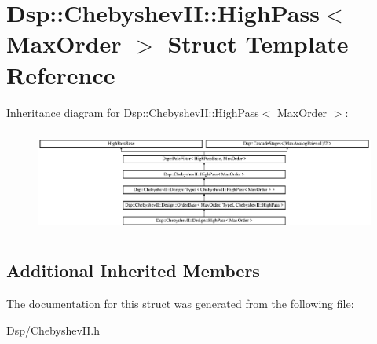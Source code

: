 \hypertarget{structDsp_1_1ChebyshevII_1_1HighPass}{\section{Dsp\-:\-:Chebyshev\-I\-I\-:\-:High\-Pass$<$ Max\-Order $>$ Struct Template Reference}
\label{structDsp_1_1ChebyshevII_1_1HighPass}
}
Inheritance diagram for Dsp\-:\-:Chebyshev\-I\-I\-:\-:High\-Pass$<$ Max\-Order $>$\-:\begin{figure}[H]
\begin{center}
\leavevmode
\includegraphics[height=3.421589cm]{structDsp_1_1ChebyshevII_1_1HighPass}
\end{center}
\end{figure}
\subsection*{Additional Inherited Members}


The documentation for this struct was generated from the following file\-:\begin{DoxyCompactItemize}
\item 
Dsp/Chebyshev\-I\-I.\-h\end{DoxyCompactItemize}
